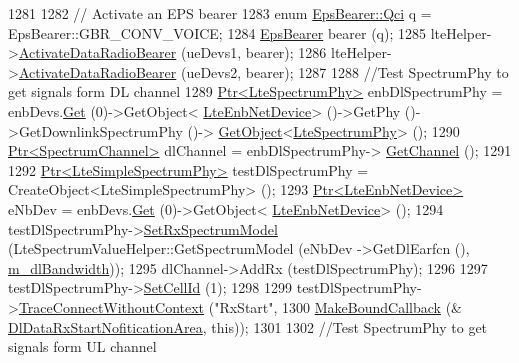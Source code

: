 \begin{DoxyCode}
1281 
1282   \textcolor{comment}{// Activate an EPS bearer}
1283   \textcolor{keyword}{enum} \hyperlink{structns3_1_1EpsBearer_aecf0c67109c5eb4ec0b07226fff5885e}{EpsBearer::Qci} q = EpsBearer::GBR\_CONV\_VOICE;
1284   \hyperlink{structns3_1_1EpsBearer}{EpsBearer} bearer (q);
1285   lteHelper->\hyperlink{classns3_1_1LteHelper_ac896e16cf162e4beeaa292d39ab1b700}{ActivateDataRadioBearer} (ueDevs1, bearer);
1286   lteHelper->\hyperlink{classns3_1_1LteHelper_ac896e16cf162e4beeaa292d39ab1b700}{ActivateDataRadioBearer} (ueDevs2, bearer);
1287 
1288   \textcolor{comment}{//Test SpectrumPhy to get signals form DL channel}
1289   \hyperlink{classns3_1_1Ptr}{Ptr<LteSpectrumPhy>} enbDlSpectrumPhy = enbDevs.\hyperlink{classns3_1_1NetDeviceContainer_a677d62594b5c9d2dea155cc5045f4d0b}{Get} (0)->GetObject<
      \hyperlink{classns3_1_1LteEnbNetDevice}{LteEnbNetDevice}> ()->GetPhy ()->GetDownlinkSpectrumPhy ()->
      \hyperlink{classns3_1_1Object_a13e18c00017096c8381eb651d5bd0783}{GetObject}<\hyperlink{classns3_1_1LteSpectrumPhy}{LteSpectrumPhy}> ();
1290   \hyperlink{classns3_1_1Ptr}{Ptr<SpectrumChannel>} dlChannel = enbDlSpectrumPhy->
      \hyperlink{classns3_1_1LteSpectrumPhy_a50f13e43568687ee32c5d63e5bf639c2}{GetChannel} ();
1291 
1292   \hyperlink{classns3_1_1Ptr}{Ptr<LteSimpleSpectrumPhy>} testDlSpectrumPhy = CreateObject<LteSimpleSpectrumPhy>
       ();
1293   \hyperlink{classns3_1_1Ptr}{Ptr<LteEnbNetDevice>} eNbDev = enbDevs.\hyperlink{classns3_1_1NetDeviceContainer_a677d62594b5c9d2dea155cc5045f4d0b}{Get} (0)->GetObject<
      \hyperlink{classns3_1_1LteEnbNetDevice}{LteEnbNetDevice}> ();
1294   testDlSpectrumPhy->\hyperlink{classns3_1_1LteSimpleSpectrumPhy_a1cbc14b5951a6c9360d3b180760429d9}{SetRxSpectrumModel} (LteSpectrumValueHelper::GetSpectrumModel (eNbDev
      ->GetDlEarfcn (), \hyperlink{classLteFrAreaTestCase_a645fc2cea287afbd373f6d702152cf47}{m\_dlBandwidth}));
1295   dlChannel->AddRx (testDlSpectrumPhy);
1296 
1297   testDlSpectrumPhy->\hyperlink{classns3_1_1LteSimpleSpectrumPhy_aed3e4883b1f03358a744746b08fbd5d8}{SetCellId} (1);
1298 
1299   testDlSpectrumPhy->\hyperlink{classns3_1_1ObjectBase_a1be45f6fd561e75dcac9dfa81b2b81e4}{TraceConnectWithoutContext} (\textcolor{stringliteral}{"RxStart"},
1300                                                  \hyperlink{group__makeboundcallback_ga1725d6362e6065faa0709f7c93f8d770}{MakeBoundCallback} (&
      \hyperlink{lte-test-frequency-reuse_8cc_a39fd51e5983e3a2105d2862729ad91e0}{DlDataRxStartNofiticationArea}, \textcolor{keyword}{this}));
1301 
1302   \textcolor{comment}{//Test SpectrumPhy to get signals form UL channel}

\end{DoxyCode}
